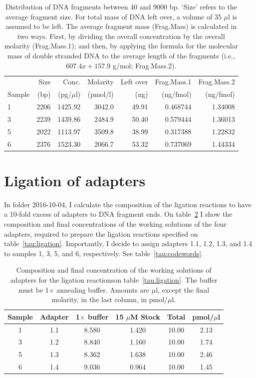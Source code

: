 \documentclass[a4paper,12pt]{article}
\begin{document}
\begin{table}
\begin{center}
\caption{Distribution of DNA fragments between 40 and 9000 bp. `Size' refers to the average fragment size. For total mass of DNA left over, a volume of 35 $\mu$l is assumed to be left. The average fragment mass (Frag.Mass) is calculated in two ways. First, by dividing the overall concentration by the overall molarity (Frag.Mass.1); and then, by applying the formula for the molecular mass of double stranded DNA to the average length of the fragments (i.e., $607.4x+157.9$ g/mol; Frag.Mass.2).}\label{tau:digestion}
\vspace*{0.3cm}
\begin{tabular}{lrrrrrr}
\toprule
&Size&Conc.&Molarity&Left over&Frag.Mass.1&Frag.Mass.2\\
Sample&(bp)&(pg/$\mu$l)&(pmol/l)&(ng)&(ng/fmol)&(ng/fmol)\\
\midrule
1&2206&1425.92&3042.0&49.91&0.468744&1.34008\\
3&2239&1439.86&2484.9&50.40&0.579444&1.36013\\
5&2022&1113.97&3509.8&38.99&0.317388&1.22832\\
6&2376&1523.30&2066.7&53.32&0.737069&1.44334\\
\bottomrule
\end{tabular}
\end{center}
\end{table}

\section{Ligation of adapters}
In folder 2016-10-04, I calculate the composition of the ligation reactions to have a 10-fold excess of adapters to DNA fragment ends. On table~\ref{tau:working} I show the composition and final concentrations of the working solutions of the four adapters, required to prepare the ligation reactions specified on table~\ref{tau:ligation}. Importantly, I decide to assign adapters 1.1, 1.2, 1.3, and 1.4 to samples 1, 3, 5, and 6, respectively. See table~\ref{tau:codewords}. 

\begin{table}
\begin{center}
\caption{Composition and final concentration of the working solutions of adapters for the ligation reactionson table~\ref{tau:ligation}. The buffer must be 1$\times$ annealing buffer. Amounts are $\mu$l, except the final molarity, in the last column, in pmol/$\mu$l.}\label{tau:working}
\vspace*{0.2cm}
\begin{tabular}{cccccc}
\toprule
Sample&Adapter&1$\times$ buffer&15 $\mu$M Stock&Total&pmol/$\mu$l\\
\midrule
1&1.1&8.580&1.420&10.00&2.13\\
3&1.2&8.840&1.160&10.00&1.74\\
5&1.3&8.362&1.638&10.00&2.46\\
6&1.4&9.036&0.964&10.00&1.45\\
\bottomrule
\end{tabular}
\end{center}
\end{table}
\end{document}
